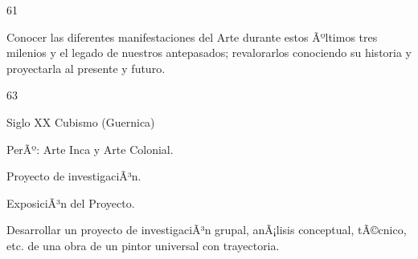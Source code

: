 \begin{syllabus}
\begin{unit}{}{}{6}{1}
\begin{unitgoals}
	\item Conocer las diferentes manifestaciones del Arte durante estos Ãºltimos tres milenios y el legado de nuestros antepasados; revalorarlos conociendo su historia y proyectarla al presente y futuro.
\end{unitgoals}
\end{unit}

\begin{unit}{}{}{6}{3}
\begin{topics}
	\item Siglo XX Cubismo (Guernica)
	\item PerÃº: Arte Inca y Arte Colonial.
	\item Proyecto de investigaciÃ³n.
	\item ExposiciÃ³n del Proyecto.
\end{topics}
\begin{unitgoals}
	\item Desarrollar un proyecto de investigaciÃ³n grupal, anÃ¡lisis conceptual, tÃ©cnico, etc. de una obra de un pintor universal con trayectoria.
\end{unitgoals}
\end{unit}



\begin{coursebibliography}
\end{coursebibliography}
\end{syllabus}

